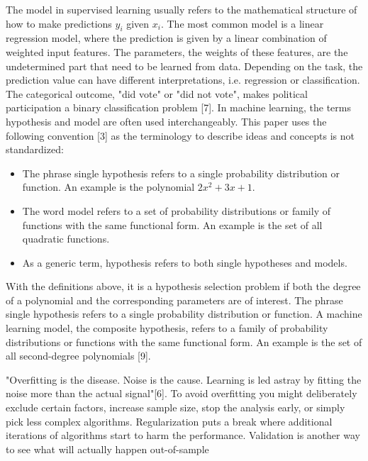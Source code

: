 The model in supervised learning usually refers to the mathematical structure of how to make predictions \(y_i\) given \(x_i\). The most common model is a linear regression model, where the prediction is given by a linear combination of weighted input features. The parameters, the weights of these features, are the undetermined part that need to be learned from data. Depending on the task, the prediction value can have different interpretations, i.e. regression or classiﬁcation. The categorical outcome, "did vote" or "did not vote", makes political participation a binary classiﬁcation problem [7]. In machine learning, the terms hypothesis and model are often used interchangeably. This paper uses the following convention [3] as the terminology to describe ideas and concepts is not standardized:

\begin{itemize}
\item The phrase single hypothesis refers to a single probability distribution or function. An example is the polynomial \(2x^2 + 3x + 1\).

\item The word model refers to a set of probability distributions or family of functions with the same functional form. An example is the set of all quadratic functions.

\item As a generic term, hypothesis refers to both single hypotheses and models.
\end{itemize}

With the deﬁnitions above, it is a hypothesis selection problem if both the degree of a polynomial and the corresponding parameters are of interest. The phrase single hypothesis refers to a single probability distribution or function. A machine learning model, the composite hypothesis, refers to a family of probability distributions or functions with the same functional form. An example is the set of all second-degree polynomials [9].


"Overﬁtting is the disease. Noise is the cause. Learning is led astray by ﬁtting the noise more than the actual signal"[6]. To avoid overﬁtting you might deliberately exclude certain factors, increase sample size, stop the analysis early, or simply pick less complex algorithms. Regularization puts a break where additional iterations of algorithms start to harm the performance. Validation is another way to see what will actually happen out-of-sample

